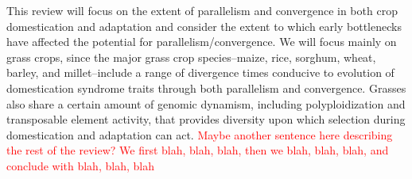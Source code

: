 \documentclass[12pt]{article}
\newcommand{\mbh}[1]{\textcolor{red}{\normalsize  #1}}
\begin{document}
This review will focus on the extent of parallelism and convergence in both crop domestication and adaptation and consider the extent to which early bottlenecks have affected the potential for parallelism/convergence.
We will focus mainly on grass crops, since the major grass crop species--maize, rice, sorghum, wheat, barley, and millet--include a range of divergence times conducive to evolution of domestication syndrome traits through both parallelism and convergence.
Grasses also share a certain amount of genomic dynamism, including polyploidization and transposable element activity, that provides diversity upon which selection during domestication and adaptation can act.
\mbh{Maybe another sentence here describing the rest of the review?  We first blah, blah, blah, then we blah, blah, blah, and conclude with blah, blah, blah}
\paragraph{}
\end{document}
